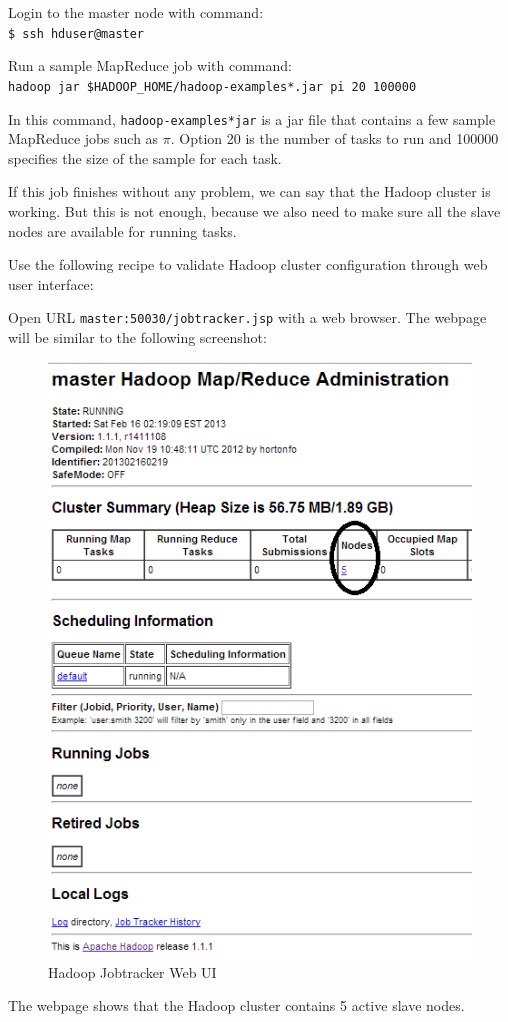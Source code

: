 Login to the master node with command: \\
\verb|$ ssh hduser@master|

Run a sample MapReduce job with command: \\
\verb|hadoop jar $HADOOP_HOME/hadoop-examples*.jar pi 20 100000|

In this command, \verb|hadoop-examples*jar| is a jar file that contains a few sample MapReduce jobs such as $\pi$. Option 20 is the number of tasks to run and 100000 specifies the size of the sample for each task.

If this job finishes without any problem, we can say that the Hadoop cluster is working. But this is not enough, because we also need to make sure all the slave nodes are available for running tasks.

Use the following recipe to validate Hadoop cluster configuration through web user interface:

Open URL \verb|master:50030/jobtracker.jsp| with a web browser.
The webpage will be similar to the following screenshot:

\begin{figure}[h]
  \centering
  \includegraphics[width=.6\textwidth]{figs/5163os_03_02.png}
  \caption{Hadoop Jobtracker Web UI}\label{fig:jobtracker.webui}
\end{figure} 


The webpage shows that the Hadoop cluster contains 5 active slave nodes.

